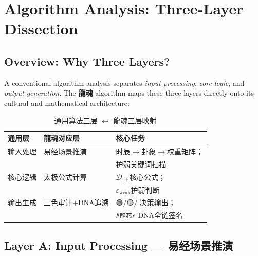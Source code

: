 \documentclass[conference]{IEEEtran}
\newcommand{\LH}{\textcolor{dragonRed}{\textbf{龍魂}}}
\begin{document}
\section{Algorithm Analysis: Three-Layer Dissection}
\label{sec:analysis}

\subsection{Overview: Why Three Layers?}

A conventional algorithm analysis separates
\emph{input processing}, \emph{core logic},
and \emph{output generation}.
The \LH{} algorithm maps these three layers directly onto
its cultural and mathematical architecture:

\begin{table}[H]
\centering
\caption{%
  通用算法三层 $\leftrightarrow$ 龍魂三层映射}
\label{tab:three-layer}
\renewcommand{\arraystretch}{1.3}
\begin{tabular}{p{2.2cm} p{2.4cm} p{3.0cm}}
\toprule
\textbf{通用层} & \textbf{龍魂对应层} & \textbf{核心任务} \\
\midrule
输入处理        & 易经场景推演       &
  时辰$\to$卦象$\to$权重矩阵；\\
                &                    &
  护弱关键词扫描 \\[4pt]
核心逻辑        & 太极公式计算       &
  $\mathcal{D}_{\text{LH}}$核心公式；\\
                &                    &
  $\varepsilon_{\text{weak}}$护弱判断 \\[4pt]
输出生成        & 三色审计$+$DNA追溯 &
  🟢/🟡/🔴决策输出；\\
                &                    &
  \texttt{\#龍芯⚡️} DNA全链签名 \\
\bottomrule
\end{tabular}
\end{table}

\subsection{Layer A: Input Processing — 易经场景推演}
\label{ssec:input}
\end{document}
